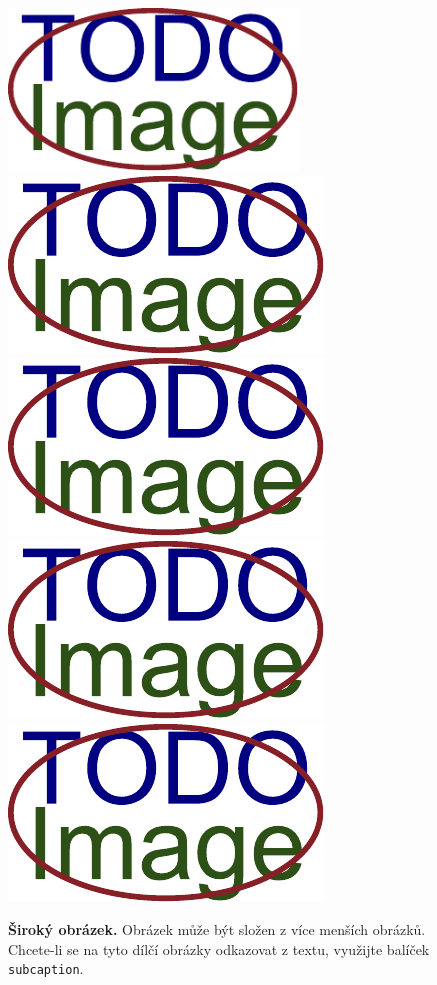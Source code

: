 \begin{figure}[h]\centering
  \centering
  \includegraphics[width=\linewidth,height=1.7in]{obrazky-figures/placeholder.pdf}\\[1pt]
  \includegraphics[width=0.24\linewidth]{obrazky-figures/placeholder.pdf}\hfill
  \includegraphics[width=0.24\linewidth]{obrazky-figures/placeholder.pdf}\hfill
  \includegraphics[width=0.24\linewidth]{obrazky-figures/placeholder.pdf}\hfill
  \includegraphics[width=0.24\linewidth]{obrazky-figures/placeholder.pdf}
  \caption{\textbf{Široký obrázek.} Obrázek může být složen z více menších obrázků. Chcete-li se na tyto dílčí obrázky odkazovat z textu, využijte balíček \texttt{subcaption}.}
  \label{sirokyObrazek}
\end{figure}


